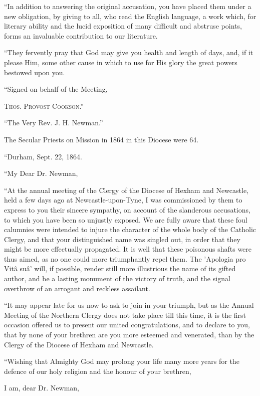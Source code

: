 ``In addition to answering the original accusation, you have
placed them under a new obligation, by giving to all, who read the
English language, a work which, for literary ability and the lucid
exposition of many difficult and abstruse points, forms an invaluable
contribution to our literature.

``They fervently pray that God may give you health and length of
days, and, if it please Him, some other cause in which to use for His
glory the great powers bestowed upon you.

``Signed on behalf of the Meeting,

T\textsc{hos}. P\textsc{rovost} C\textsc{ookson}.''

``The Very Rev. J. H. Newman.''


The Secular Priests on Mission in 1864 in this Diocese were 64.

``Durham, Sept. 22, 1864.

``My Dear Dr. Newman,

``At the annual meeting of the Clergy of the Diocese of Hexham and
Newcastle, held a few days ago at Newcastle-upon-Tyne, I was
commissioned by them to express to you their sincere sympathy, on
account of the slanderous accusations, to which you have been so
unjustly exposed. We are fully aware that these foul calumnies were
intended to injure the character of the whole body of the Catholic
Clergy, and that your distinguished name was singled out, in order that
they might be more effectually propagated. It is well that these
poisonous shafts were thus aimed, as no one could more
triumphantly repel them. The 'Apologia pro Vitâ suâ' will, if
possible, render still more illustrious the name of its gifted author,
and be a lasting monument of the victory of truth, and the signal
overthrow of an arrogant and reckless assailant.

``It may appear late for us now to ask to join in your triumph,
but as the Annual Meeting of the Northern Clergy does not take place
till this time, it is the first occasion offered us to present our
united congratulations, and to declare to you, that by none of your
brethren are you more esteemed and venerated, than by the Clergy of the
Diocese of Hexham and Newcastle.

``Wishing that Almighty God may prolong your life many more years
for the defence of our holy religion and the honour of your brethren,

I am, dear Dr. Newman,

